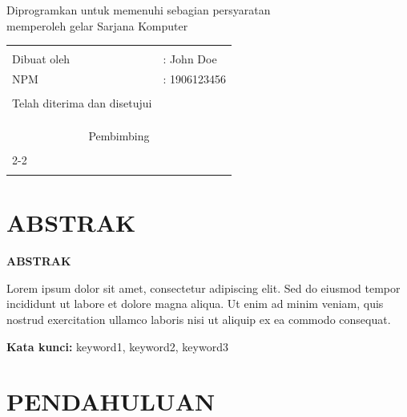 \documentclass[12pt,a4paper,oneside]{book}
\begin{document}
\vspace{2cm}

Diprogramkan untuk memenuhi sebagian persyaratan\\
memperoleh gelar Sarjana Komputer

\vspace{2cm}

\begin{tabular}{p{3cm}p{8cm}}
    & \\
    Dibuat oleh & : John Doe \\
    NPM & : 1906123456 \\
    & \\
    Telah diterima dan disetujui & \\
    & \\
    & \\
    & \\
    \hline
    \multicolumn{2}{c}{Pembimbing} \\
    & \\
    \cline{2-2}
    & \\
    & \\
\end{tabular}

\chapter*{ABSTRAK}
\vspace{1cm}

{\Large\bfseries ABSTRAK\par}
\vspace{0.5cm}

Lorem ipsum dolor sit amet, consectetur adipiscing elit. Sed do eiusmod tempor incididunt ut labore et dolore magna aliqua. Ut enim ad minim veniam, quis nostrud exercitation ullamco laboris nisi ut aliquip ex ea commodo consequat. 

\vspace{0.5cm}
\textbf{Kata kunci:} keyword1, keyword2, keyword3

\tableofcontents
{}

\listoftables
{}

\listoffigures
{}

\chapter{PENDAHULUAN}
\thispagestyle{fancy}
\end{document}

